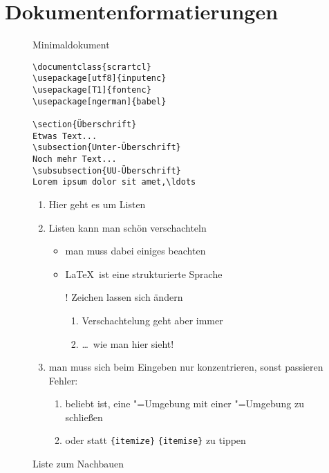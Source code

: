 \section{Dokumentenformatierungen}

\begin{figure}[b!]
	\begin{minipage}[t]{.5\textwidth}
	\caption{Minimaldokument}\label{minimaldoc}
	\begin{verbatim}
\documentclass{scrartcl}
\usepackage[utf8]{inputenc}
\usepackage[T1]{fontenc}
\usepackage[ngerman]{babel}

\section{Überschrift}
Etwas Text...
\subsection{Unter-Überschrift}
Noch mehr Text...
\subsubsection{UU-Überschrift}
Lorem ipsum dolor sit amet,\ldots

	\end{verbatim}
	\end{minipage}
	\begin{minipage}[t]{.5\textwidth}
	\caption{Liste zum Nachbauen}\label{enumerate}\small
	\begin{enumerate}
		\item Hier geht es um Listen
		\item Listen kann man schön verschachteln
		\begin{itemize}
			\item man muss dabei einiges beachten
			\item \LaTeX\ ist eine strukturierte Sprache
			\item[!] Zeichen lassen sich ändern
			\begin{enumerate} 
				\item Verschachtelung geht aber immer
				\item \dots\ wie man hier sieht!
			\end{enumerate}
		\end{itemize}
		\item man muss sich beim Eingeben nur konzentrieren, sonst 
			passieren Fehler:
		\begin{enumerate}[label=(\roman*)]
			\item beliebt ist, eine "=Umgebung mit 
				einer "=Umgebung zu schließen
			\item oder statt \texttt{\{itemi\textit{z}e\}} 
				\texttt{\{itemi\textit{s}e\}} zu tippen
		\end{enumerate}
	\end{enumerate}
	\end{minipage}
\end{figure}


